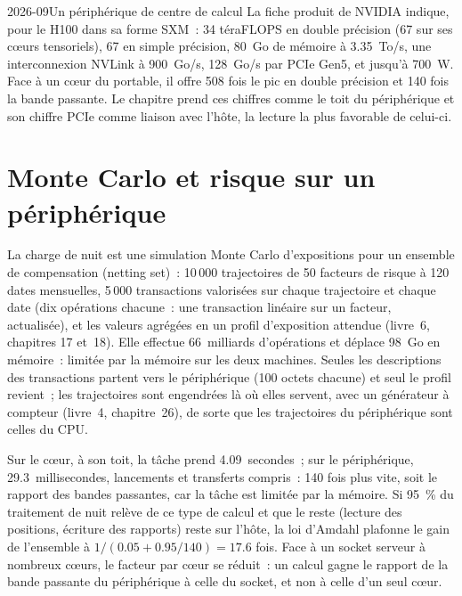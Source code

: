 \begin{dated}{2026-09}{Un périphérique de centre de calcul}\label{dat:pl:accelerators-for-quantitative-work:h100}
La fiche produit de NVIDIA indique, pour le H100 dans sa forme SXM~: 34 téraFLOPS en double précision (67 sur ses cœurs tensoriels), 67 en simple
précision, 80~Go de mémoire à 3.35~To/s, une interconnexion NVLink à 900~Go/s, 128~Go/s par PCIe Gen5, et jusqu'à 700~W. Face à un cœur du portable, il offre 508
fois le pic en double précision et 140 fois la bande passante. Le chapitre prend ces chiffres comme le toit du périphérique et son
chiffre PCIe comme liaison avec l'hôte, la lecture la plus favorable de celui-ci.
\end{dated}

\section{Monte Carlo et risque sur un périphérique}

La charge de nuit est une simulation Monte Carlo d'expositions pour un ensemble de compensation (netting set)~: 10\,000 trajectoires de 50 facteurs de risque à
120 dates mensuelles, 5\,000 transactions valorisées sur chaque trajectoire et chaque date (dix opérations chacune~: une transaction linéaire sur un
facteur, actualisée), et les valeurs agrégées en un profil d'exposition attendue (livre~6, chapitres 17 et~18). Elle effectue 66~milliards d'opérations et déplace 98~Go en mémoire~: limitée par la mémoire sur les
deux machines. Seules les descriptions des transactions partent vers le périphérique (100 octets chacune) et seul le profil revient~; les trajectoires sont engendrées là où
elles servent, avec un générateur à compteur (livre~4, chapitre~26), de sorte que les trajectoires du périphérique sont celles du CPU.

\label{lst:pl:accelerators-for-quantitative-work:model}

Sur le cœur, à son toit, la tâche prend 4.09~secondes~; sur le périphérique, 29.3~millisecondes, lancements et transferts compris~: 140 fois plus
vite, soit le rapport des bandes passantes, car la tâche est limitée par la mémoire. Si 95~\% du traitement de nuit relève de ce type de calcul et que
le reste (lecture des positions, écriture des rapports) reste sur l'hôte, la loi d'Amdahl plafonne le gain de l'ensemble à $1/(0.05 + 0.95/140) = 17.6$ fois.
Face à un socket serveur à nombreux cœurs, le facteur par cœur se réduit~: un calcul  gagne le rapport de la bande passante du
périphérique à celle du socket, et non à celle d'un seul cœur.

